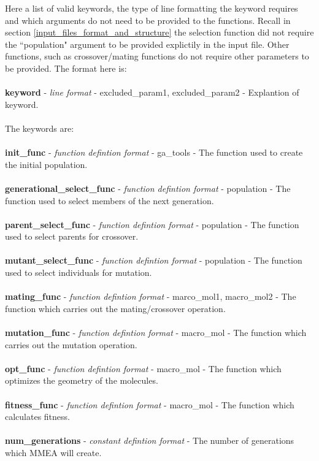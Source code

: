 \documentclass{article}
\begin{document}
Here a list of valid keywords, the type of line formatting the keyword requires and which arguments do not need to be provided to the functions. Recall in section \ref{input_files_format_and_structure} the selection function did not require the ``population" argument to be provided explictily in the input file. Other functions, such as crossover/mating functions do not require other parameters to be provided. The format here is:
\\
\\
\textbf{keyword} - \textit{line format} - excluded\_param1, excluded\_param2 - Explantion of keyword.
\\
\\
The keywords are:
\\
\\
\textbf{init\_func} - \textit{function defintion format} - ga\_tools - The function used to create the initial population.
\\
\\
\textbf{generational\_select\_func} - \textit{function defintion format} - population - The function used to select members of the next generation.
\\
\\
\textbf{parent\_select\_func} - \textit{function defintion format} - population - The function used to select parents for crossover.
\\
\\
\textbf{mutant\_select\_func} - \textit{function defintion format} - population - The function used to select individuals for mutation.
\\
\\
\textbf{mating\_func} - \textit{function defintion format} - marco\_mol1, macro\_mol2 - The function which carries out the mating/crossover operation.
\\
\\
\textbf{mutation\_func} - \textit{function defintion format} - macro\_mol - The function which carries out the mutation operation.
\\
\\
\textbf{opt\_func} - \textit{function defintion format} - macro\_mol - The function which optimizes the geometry of the molecules.
\\
\\
\textbf{fitness\_func} - \textit{function defintion format} - macro\_mol - The function which calculates fitness.
\\
\\
\textbf{num\_generations} - \textit{constant defintion format} - The number of generations which MMEA will create.
\end{document}
